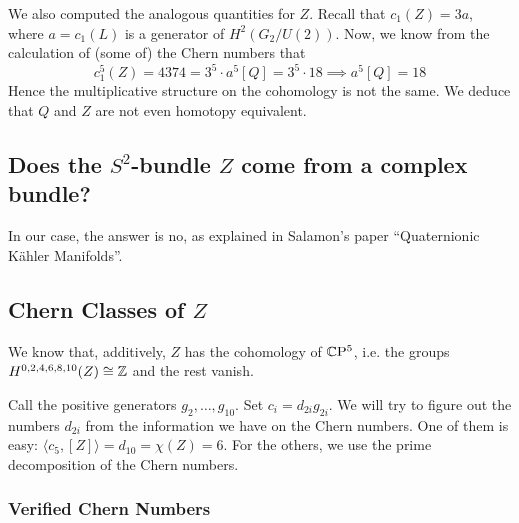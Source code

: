 \documentclass{scrartcl}
\begin{document}
We also computed the analogous quantities for $Z$. Recall that $c_1(Z)=3a$, where $a=c_1(L)$ is a generator of $H^2(G_2/U(2))$.
Now, we know from the calculation of (some of) the Chern numbers that
\begin{equation*}
	c_1^5(Z)=4374=3^5\cdot a^5[Q]=3^5\cdot 18\implies a^5[Q]=18
\end{equation*}
Hence the multiplicative structure on the cohomology is not the same. We deduce that $Q$ and $Z$ are not even homotopy equivalent.

\subsection{Does the $S^2$-bundle $Z$ come from a complex bundle?}

In our case, the answer is no, as explained in Salamon's paper ``Quaternionic K\"{a}hler Manifolds''.

\subsection{Chern Classes of $Z$}

We know that, additively, $Z$ has the cohomology of $\mathbb{C}\mathrm{P}^5$, i.e. the groups $H^{0,2,4,6,8,10}(Z)\cong\mathbb{Z}$ and the rest vanish.

\medskip

Call the positive generators $g_2,\dots,g_{10}$. Set $c_i=d_{2i}g_{2i}$. We will try to figure out the numbers $d_{2i}$ from the information we have on the Chern numbers. One of them is easy: $\langle c_5,[Z]\rangle=d_{10}=\chi(Z)=6$. For the others, we use the prime decomposition of the Chern numbers.

\subsubsection{Verified Chern Numbers}
\end{document}
